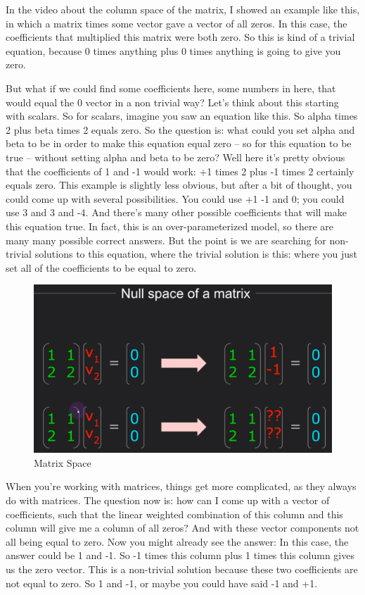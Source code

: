 \documentclass[fleqn,10pt]{olplainarticle}
\theoremstyle{definition}
\theoremstyle{remark}
\begin{document}
In the video about the column space of the matrix, I showed an example like this, in which a matrix times some vector gave a vector of all zeros. In this case, the coefficients that multiplied this matrix were both zero. So this is kind of a trivial equation, because 0 times anything plus 0 times anything is going to give you zero.

But what if we could find some coefficients here, some numbers in here, that would equal the 0 vector in a non trivial way? Let's think about this starting with scalars. So for scalars, imagine you saw an equation like this. So alpha times 2 plus beta times 2 equals zero. So the question is: what could you set alpha and beta to be in order to make this equation equal zero -- so for this equation to be true -- without setting alpha and beta to be zero? Well here it's pretty obvious that the coefficients of 1 and -1 would work: +1 times 2 plus -1 times 2 certainly equals zero. This example is slightly less obvious, but after a bit of thought, you could come up with several possibilities. You could use +1 -1 and 0; you could use 3 and 3 and -4. And there's many other possible coefficients that will make this equation true. In fact, this is an over-parameterized model, so there are many many possible correct answers. But the point is we are searching for non-trivial solutions to this equation, where the trivial solution is this: where you just set all of the coefficients to be equal to zero.

\begin{figure}[ht]
	\centering
	\includegraphics[width=0.5\linewidth]{images/matrix-space-18.png}
	\caption{Matrix Space}
	\label{fig:matrix_space_18}
\end{figure}

When you're working with matrices, things get more complicated, as they always do with matrices. The question now is: how can I come up with a vector of coefficients, such that the linear weighted combination of this column and this column will give me a column of all zeros? And with these vector components not all being equal to zero. Now you might already see the answer: In this case, the answer could be 1 and -1. So -1 times this column plus 1 times this column gives us the zero vector. This is a non-trivial solution because these two coefficients are not equal to zero. So 1 and -1, or maybe you could have said -1 and +1.
\end{document}
